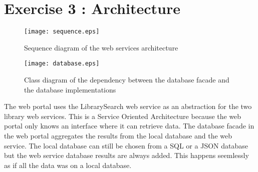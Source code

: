 \section{Exercise 3 : Architecture}
    \begin{figure}[p]
      \texttt{[image: sequence.eps]}
      \caption{\label{fig:before}Sequence diagram of the web services architecture}
    \end{figure}

    \begin{figure}[p]
      \texttt{[image: database.eps]}
      \caption{\label{fig:before}Class diagram of the dependency between the database facade and the database implementations}
    \end{figure}

    The web portal uses the LibrarySearch web service as an abstraction for the two library web services. This is a Service Oriented Architecture because the web portal only knows an interface where it can retrieve data.
    The database facade in the web portal aggregates the results from the local database and the web service. The local database can still be chosen from a SQL or a JSON database but the web service database results are always added. This happens seemlessly as if all the data was on a local database.
